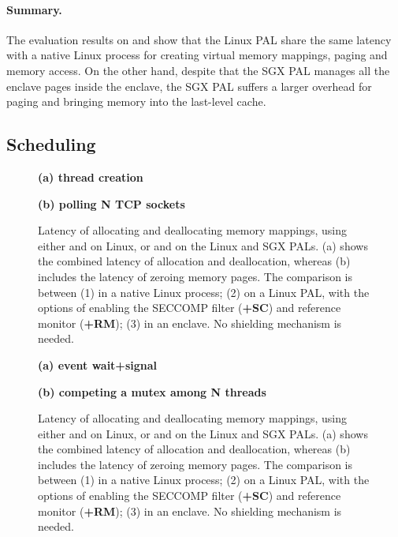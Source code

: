\paragraph{Summary.}
The evaluation results on  and 
show that the Linux PAL share the same latency
with a native Linux process
for creating virtual memory mappings, paging and memory access.
On the other hand, despite that the SGX PAL manages all the enclave pages
inside the enclave,
the SGX PAL suffers a larger overhead for paging and bringing memory into the last-level cache.



\subsection{Scheduling}




\begin{figure*}[t!]
\centering
\footnotesize
{}
\parbox{0.49\textwidth}{\centering\bf (a) thread creation}
\parbox{0.49\textwidth}{\centering\bf (b) polling N TCP sockets}
\caption{Latency of allocating and deallocating memory mappings, using either  and  on Linux, or  and  on the Linux and SGX PALs.
(a) shows the combined latency of allocation and deallocation, whereas (b) includes the latency of zeroing memory pages.
The comparison is between (1) \linuxapis{} in a native Linux process; (2) \hostapis{} on a Linux PAL, with the options of enabling the SECCOMP filter ({\bf +SC}) and reference monitor ({\bf +RM}); (3) \hostapis{} in an enclave. No shielding mechanism is needed.}
\label{fig:eval:pal:thread-select-latency}
\end{figure*}






\begin{figure*}[t!]
\centering
\footnotesize
{}
\parbox{0.49\textwidth}{\centering\bf (a) event wait+signal}
\parbox{0.49\textwidth}{\centering\bf (b) competing a mutex among N threads}
\caption{Latency of allocating and deallocating memory mappings, using either  and  on Linux, or  and  on the Linux and SGX PALs.
(a) shows the combined latency of allocation and deallocation, whereas (b) includes the latency of zeroing memory pages.
The comparison is between (1) \linuxapis{} in a native Linux process; (2) \hostapis{} on a Linux PAL, with the options of enabling the SECCOMP filter ({\bf +SC}) and reference monitor ({\bf +RM}); (3) \hostapis{} in an enclave. No shielding mechanism is needed.}
\label{fig:eval:pal:mmap-latency}
\end{figure*}




